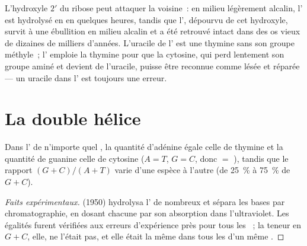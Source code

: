 \begin{example}\label{ex:b1:nucleic-acids:fragile}
L'hydroxyle $2'$ du ribose peut attaquer la 
voisine~: en milieu légèrement alcalin, l' est hydrolysé en
 en quelques heures, tandis que l', dépourvu de cet
hydroxyle, survit à une ébullition en milieu alcalin et a été retrouvé
intact dans des os vieux de dizaines de milliers d'années. L'uracile de
l' est une thymine sans son groupe méthyle~; l' emploie la thymine
pour que la cytosine, qui perd lentement son groupe aminé et devient de
l'uracile, puisse être reconnue comme lésée et réparée --- un uracile
dans l' est toujours une erreur.
\end{example}

\section{La double hélice}

\begin{proposition}\label{prop:b1:nucleic-acids:chargaff}
Dans l' de n'importe quel , la quantité d'adénine égale
celle de thymine et la quantité de guanine celle de cytosine ($A = T$,
$G = C$, donc  $=$ ), tandis que le rapport $(G + C)/(A + T)$
varie d'une espèce à l'autre (de \qty{25}{\%} à \qty{75}{\%} de
$G + C$).
\end{proposition}
\begin{proof}[Faits expérimentaux]
 (1950) hydrolysa l' de nombreux  et sépara les
bases par chromatographie, en dosant chacune par son absorption dans
l'ultraviolet. Les égalités furent vérifiées aux erreurs d'expérience
près pour tous les ~; la teneur en $G + C$, elle, ne l'était pas, et
elle était la même dans tous les  d'un même .
\end{proof}

